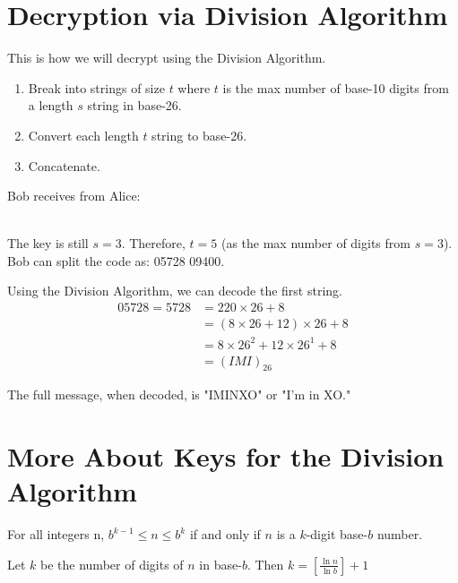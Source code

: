 \section{Decryption via Division Algorithm}
This is how we will decrypt using the Division Algorithm.

\begin{enumerate}
\item Break into strings of size $t$ where $t$ is the max number of base-10 digits from a length $s$ string in base-26.
\item Convert each length $t$ string to base-26.
\item Concatenate.
\end{enumerate}


\begin{example}

Bob receives from Alice: 

{\\}
The key is still $s=3$. Therefore, $t=5$ (as the max number of digits from $s=3$).
Bob can split the code as: 05728 09400.

Using the Division Algorithm, we can decode the first string.
\begin{equation} \label{eq1}
\begin{split}
05728 = 5728 & = 220 \times 26 + 8\\
 & = (8 \times 26 + 12) \times 26 + 8\\
  & = 8 \times 26^{2} + 12 \times 26^{1} + 8\\
  & = (I M I)_{26}
\end{split}
\end{equation}

The full message, when decoded, is "IMINXO" or "I'm in XO."


\end{example}

\section{More About Keys for the Division Algorithm}

\begin{theorem}
For all integers n, $b^{k-1} \leq n \le b^{k}$ if and only if $n$ is a $k$-digit base-$b$ number.
\end{theorem}
\begin{corollary}\label{cor:ExampleCor} Let $k$ be the number of digits of $n$ in base-$b$. Then $k = [\frac{\ln {n}}{\ln {b}}] + 1$ \end{corollary}

